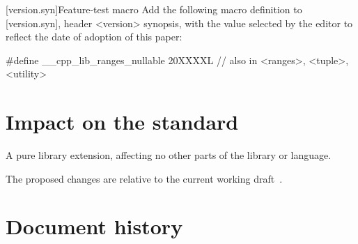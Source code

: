 \documentclass[a4paper,10pt,oneside,openany,final,article]{memoir}
\begin{document}
\begin{wording}
[version.syn]{Feature-test macro}
Add the following macro definition to [version.syn], header <version> synopsis, with the value selected by the editor to reflect the date of adoption of this paper:

\begin{codeblock}
  #define __cpp_lib_ranges_nullable 20XXXXL // also in <ranges>, <tuple>, <utility>
\end{codeblock}

\end{wording}

\chapter{Impact on the standard}

A pure library extension, affecting no other parts of the library or language.

The proposed changes are relative to the current working draft~\cite{N4958}.

\chapter*{Document history}
\end{document}
